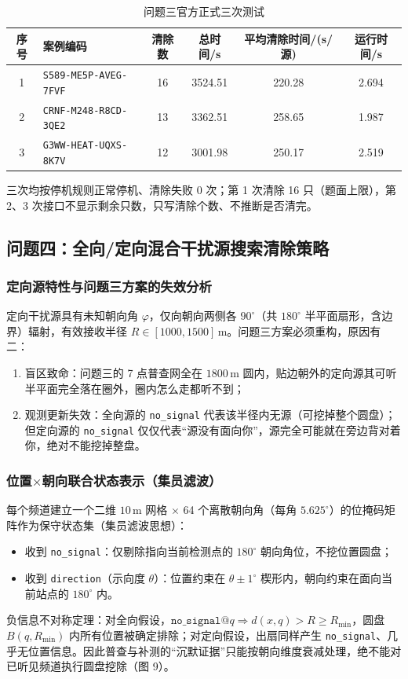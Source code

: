 \documentclass[12pt,a4paper]{article}
\begin{document}
\begin{table}[H]
\centering
\caption{问题三官方正式三次测试}
\small
\begin{tabularx}{\textwidth}{@{}cYcccc@{}}
\toprule
\textbf{序号} & \textbf{案例编码} & \textbf{清除数} & \textbf{总时间/s} & \textbf{平均清除时间/(s/源)} & \textbf{运行时间/s} \\
 & \texttt{S589-ME5P-AVEG-7FVF} & 16 & 3524.51 & 220.28 & 2.694 \\
2 & \texttt{CRNF-M248-R8CD-3QE2} & 13 & 3362.51 & 258.65 & 1.987 \\
3 & \texttt{G3WW-HEAT-UQXS-8K7V} & 12 & 3001.98 & 250.17 & 2.519 \\
\bottomrule
\end{tabularx}
\end{table}

三次均按停机规则正常停机、清除失败 0 次；第 1 次清除 16 只（题面上限），第 2、3 次接口不显示剩余只数，只写清除个数、不推断是否清完。

\subsection{问题四：全向/定向混合干扰源搜索清除策略}
\subsubsection{定向源特性与问题三方案的失效分析}
定向干扰源具有未知朝向角 $\varphi$，仅向朝向两侧各 $90^{\circ}$（共 $180^{\circ}$ 半平面扇形，含边界）辐射，有效接收半径 $R\in[1000,1500]\,\mathrm{m}$。问题三方案必须重构，原因有二：
\begin{enumerate}
\item 盲区致命：问题三的 7 点普查网全在 $1800\,\mathrm{m}$ 圆内，贴边朝外的定向源其可听半平面完全落在圈外，圈内怎么走都听不到；
\item 观测更新失效：全向源的 \texttt{no\_signal} 代表该半径内无源（可挖掉整个圆盘）；但定向源的 \texttt{no\_signal} 仅仅代表“源没有面向你”，源完全可能就在旁边背对着你，绝对不能挖掉整盘。
\end{enumerate}

\subsubsection{位置$\times$朝向联合状态表示（集员滤波）}
每个频道建立一个二维 $10\,\mathrm{m}$ 网格 $\times$ 64 个离散朝向角（每角 $5.625^{\circ}$）的位掩码矩阵作为保守状态集（集员滤波思想）：
\begin{itemize}
\item 收到 \texttt{no\_signal}：仅剔除指向当前检测点的 $180^{\circ}$ 朝向角位，不挖位置圆盘；
\item 收到 \texttt{direction}（示向度 $\theta$）：位置约束在 $\theta\pm 1^{\circ}$ 楔形内，朝向约束在面向当前站点的 $180^{\circ}$ 内。
\end{itemize}
负信息不对称定理：对全向假设，$\texttt{no\_signal}@q\Rightarrow d(x,q)>R\ge R_{\min}$，圆盘 $B(q,R_{\min})$ 内所有位置被确定排除；对定向假设，出扇同样产生 \texttt{no\_signal}、几乎无位置信息。因此普查与补测的“沉默证据”只能按朝向维度衰减处理，绝不能对已听见频道执行圆盘挖除（图 9）。
\end{document}
